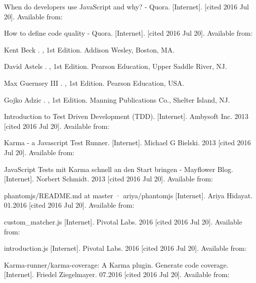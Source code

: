 \documentclass[11pt]{article}
\begin{document}
\begin{thebibliography}{9}

 When do developers use JavaScript and why? - Quora. [Internet]. [cited 2016 Jul 20]. Available from:

 How to define code quality - Quora. [Internet]. [cited 2016 Jul 20]. Available from:

 Kent Beck
.
, 1st Edition.
\newblock Addison Wesley, Boston, MA.

 David Astels
.
, 1st Edition.
\newblock Pearson Education, Upper Saddle River, NJ.

 Max Guernsey III 
.
, 1st Edition.
\newblock Pearson Education, USA.

 Gojko Adzic
.
, 1st Edition.
\newblock Manning Publications Co., Shelter Island, NJ.

 Introduction to Test Driven Development (TDD). [Internet]. Ambysoft Inc. 2013 [cited 2016 Jul 20]. Available from: 

 Karma - a Javascript Test Runner. [Internet]. Michael G Bielski. 2013 [cited 2016 Jul 20]. Available from:

 JavaScript Tests mit Karma schnell an den Start bringen - Mayflower Blog. [Internet]. Norbert Schmidt. 2013 [cited 2016 Jul 20]. Available from:

 phantomjs/README.md at master · ariya/phantomjs [Internet]. Ariya Hidayat. 01.2016 [cited 2016 Jul 20]. Available from:

 custom\_matcher.js [Internet]. Pivotal Labs. 2016 [cited 2016 Jul 20]. Available from:

 introduction.js [Internet]. Pivotal Labs. 2016 [cited 2016 Jul 20]. Available from:

 Karma-runner/karma-coverage: A Karma plugin. Generate code coverage. [Internet]. Friedel Ziegelmayer. 07.2016 [cited 2016 Jul 20]. Available from:

\end{thebibliography}
\end{document}
